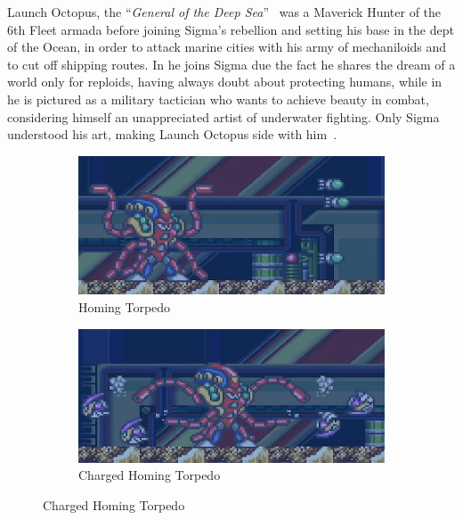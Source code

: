 Launch Octopus, the ``\textit{General of the Deep Sea}''~\cite{book:MMX_Complete_art} was a Maverick Hunter of the 6th Fleet armada before joining Sigma's rebellion and setting his base in the dept of the Ocean, in order to attack marine cities with his army of mechaniloids and to cut off shipping routes. In \x he joins Sigma due the fact he shares the dream of a world only for reploids, having always doubt about protecting humans, while in \mhx he is pictured as a military tactician who wants to achieve beauty in combat, considering himself an unappreciated artist of underwater fighting. Only Sigma understood his art, making Launch Octopus side with him~\cite{wiki:MM_MHX_script}.

\begin{figure}[htp]
	\centering
	\begin{subfigure}{0.48\textwidth}
		\centering
		\includegraphics[width=\linewidth]{figures/X1/Launch_octopus/Octopus_missile.jpg}
		\caption{Homing Torpedo}
	\end{subfigure}
	\begin{subfigure}{0.49\textwidth}
		\centering
		\includegraphics[width=\linewidth]{figures/X1/Launch_octopus/Octopus_piranha.jpg}
		\caption{Charged Homing Torpedo}
	\end{subfigure}
\end{figure}


